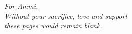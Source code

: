 
\begin{dedication} 
\vspace*{5cm}
\textit{For Ammi,\\
Without your sacrifice, love and support\\
these pages would remain blank.}
\vspace*{5cm}
\end{dedication}


